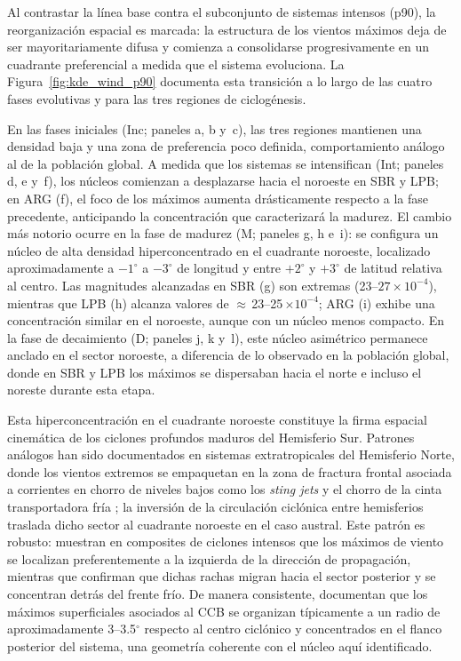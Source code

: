 Al contrastar la línea base contra el subconjunto de sistemas intensos (p90), la reorganización espacial es marcada: la estructura de los vientos máximos deja de ser mayoritariamente difusa y comienza a consolidarse progresivamente en un cuadrante preferencial a medida que el sistema evoluciona. 
La Figura~\ref{fig:kde_wind_p90} documenta esta transición a lo largo de las cuatro fases evolutivas y para las tres regiones de ciclogénesis.

En las fases iniciales (Inc; paneles a, b y~c), las tres regiones mantienen una densidad baja y una zona de preferencia poco definida, comportamiento análogo al de la población global. 
A medida que los sistemas se intensifican (Int; paneles d, e y~f), los núcleos comienzan a desplazarse hacia el noroeste en SBR y LPB; en ARG (f), el foco de los máximos aumenta drásticamente respecto a la fase precedente, anticipando la concentración que caracterizará la madurez. 
El cambio más notorio ocurre en la fase de madurez (M; paneles g, h e~i): se configura un núcleo de alta densidad hiperconcentrado en el cuadrante noroeste, localizado aproximadamente a $-1^{\circ}$ a $-3^{\circ}$ de longitud y entre $+2^{\circ}$ y $+3^{\circ}$ de latitud relativa al centro.
Las magnitudes alcanzadas en SBR (g) son extremas (23--$27 \times 10^{-4}$), mientras que LPB (h) alcanza valores de ${\approx}$\,23--25\,$\times 10^{-4}$; ARG (i) exhibe una concentración similar en el noroeste, aunque con un núcleo menos compacto. 
En la fase de decaimiento (D; paneles j, k y~l), este núcleo asimétrico permanece anclado en el sector noroeste, a diferencia de lo observado en la población global, donde en SBR y LPB los máximos se dispersaban hacia el norte e incluso el noreste durante esta etapa.

Esta hiperconcentración en el cuadrante noroeste constituye la firma espacial cinemática de los ciclones profundos maduros del Hemisferio Sur. 
Patrones análogos han sido documentados en sistemas extratropicales del Hemisferio Norte, donde los vientos extremos se empaquetan en la zona de fractura frontal asociada a corrientes en chorro de niveles bajos como los \textit{sting jets} y el chorro de la cinta transportadora fría \citep{clark2005sting, clark2018sting, eisenstein2023identification}; la inversión de la circulación ciclónica entre hemisferios traslada dicho sector al cuadrante noroeste en el caso austral.
Este patrón es robusto: \citet{hodges2011comparison} muestran en composites de ciclones intensos que los máximos de viento se localizan preferentemente a la izquierda de la dirección de propagación, mientras que \citet{laurila2021characteristics} confirman que dichas rachas migran hacia el sector posterior y se concentran detrás del frente frío. 
De manera consistente, \citet{priestley2022improved} documentan que los máximos superficiales asociados al CCB se organizan típicamente a un radio de aproximadamente 3--3.5$^{\circ}$ respecto al centro ciclónico y concentrados en el flanco posterior del sistema, una geometría coherente con el núcleo aquí identificado.

